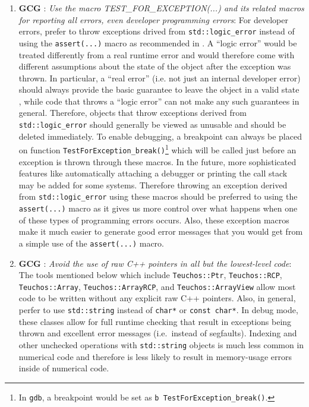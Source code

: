\begin{enumerate}

{}\item{}\textbf{GCG }:
{}\textit{Use the macro TEST\-\_FOR\-\_EXCEPTION(...) and its related
macros for reporting all errors, even developer programming errors}: For
developer errors, prefer to throw exceptions drived from
{}\texttt{std\-::logic\-\_error} instead of using the {}\texttt{assert(...)}
macro as recommended in {}\cite[Item 68]{C++CodingStandards05}.  A ``logic
error'' would be treated differently from a real runtime error and would
therefore come with different assumptions about the state of the object after
the exception was thrown.  In particular, a ``real error'' (i.e. not just an
internal developer error) should always provide the basic guarantee to leave
the object in a valid state {}\cite[Item 71]{C++CodingStandards05}, while code
that throws a ``logic error'' can not make any such guarantees in general.
Therefore, objects that throw exceptions derived from
{}\texttt{std\-::logic\-\_error} should generally be viewed as unusable and
should be deleted immediately.  To enable debugging, a breakpoint can always
be placed on function {}\texttt{Test\-For\-Exception\-\_break()}\footnote{In
{}\texttt{gdb}, a breakpoint would be set as {}\texttt{b
Test\-For\-Exception\-\_break()}.} which will be called just before an
exception is thrown through these macros.  In the future, more sophisticated
features like automatically attaching a debugger or printing the call stack
may be added for some systems.  Therefore throwing an exception derived from
{}\texttt{std\-::logic\-\_error} using these macros should be preferred to
using the {}\texttt{assert(...)} macro as it gives us more control over what
happens when one of these types of programming errors occurs.  Also, these
exception macros make it much easier to generate good error messages that you
would get from a simple use of the {}\texttt{assert(...)} macro.

{}\item{}\textbf{GCG }:
{}\textit{Avoid the use of raw C++ pointers in all but the lowest-level code}:
The tools mentioned below which include {}\texttt{Teuchos::\-Ptr},
{}\texttt{Teuchos::\-RCP}, {}\texttt{Teuchos::\-Array},
{}\texttt{Teuchos::\-Array\-RCP}, and {}\texttt{Teuchos::\-Array\-View} allow
most code to be written without any explicit raw C++ pointers.  Also, in
general, perfer to use {}\texttt{std\-::string} instead of {}\texttt{char*} or
{}\texttt{const char*}.  In debug mode, these classes allow for full runtime
checking that result in exceptions being thrown and excellent error messages
(i.e.\ instead of segfaults).  Indexing and other unchecked operations with
{}\texttt{std\-::string} objects is much less common in numerical code and
therefore is less likely to result in memory-usage errors inside of numerical
code.


\end{enumerate}
